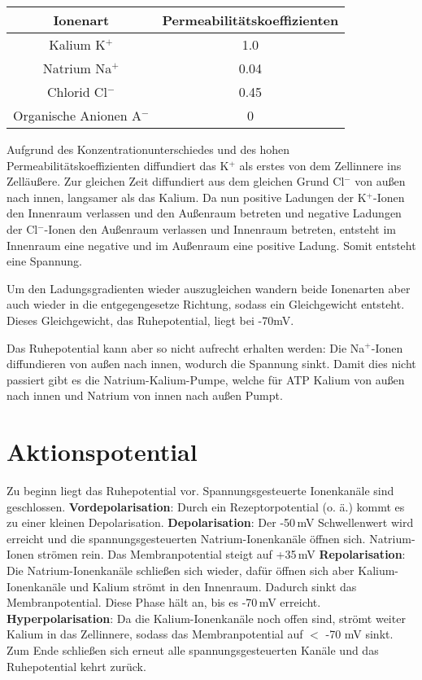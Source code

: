 \documentclass{article}
\begin{document}
\begin{center}
\begin{tabular}{ |c|c| }
\hline
 Ionenart & Permeabilitätskoeffizienten \\ 
\hline
 Kalium K$^+$ & 1.0 \\  
\hline
 Natrium Na$^+$ & 0.04 \\
\hline
 Chlorid Cl$^-$ & 0.45 \\  
\hline
 Organische Anionen A$^-$ & 0 \\
\hline 
\end{tabular}
\end{center}
Aufgrund des Konzentrationunterschiedes und des hohen Permeabilitätskoeffizienten diffundiert das K$^+$ als erstes von dem Zellinnere ins Zelläußere.
Zur gleichen Zeit diffundiert aus dem gleichen Grund Cl$^-$ von außen nach innen, langsamer als das Kalium.
Da nun positive Ladungen der K$^+$-Ionen den Innenraum verlassen und den Außenraum betreten und negative Ladungen der Cl$^-$-Ionen den Außenraum verlassen und Innenraum betreten, entsteht im Innenraum eine negative und im Außenraum eine positive Ladung. Somit entsteht eine Spannung.
  

Um den Ladungsgradienten wieder auszugleichen wandern beide Ionenarten aber auch wieder in die entgegengesetze Richtung, sodass ein Gleichgewicht entsteht.
Dieses Gleichgewicht, das Ruhepotential, liegt bei -70mV. 
 

Das Ruhepotential kann aber so nicht aufrecht erhalten werden: Die Na$^+$-Ionen diffundieren von außen nach innen, wodurch die Spannung sinkt.
Damit dies nicht passiert gibt es die Natrium-Kalium-Pumpe, welche für ATP Kalium von außen nach innen und Natrium von innen nach außen Pumpt. 
\section{Aktionspotential}
Zu beginn liegt das Ruhepotential vor. Spannungsgesteuerte Ionenkanäle sind geschlossen. \newline
\textbf{Vordepolarisation}: Durch ein Rezeptorpotential (o. ä.) kommt es zu einer kleinen Depolarisation. \newline
\textbf{Depolarisation}: Der -50\,mV Schwellenwert wird erreicht und die spannungsgesteuerten Natrium-Ionenkanäle öffnen sich. Natrium-Ionen strömen rein. Das Membranpotential steigt auf +35\,mV \newline
\textbf{Repolarisation}: Die Natrium-Ionenkanäle schließen sich wieder, dafür öffnen sich aber Kalium-Ionenkanäle und Kalium strömt in den Innenraum. Dadurch sinkt das Membranpotential. Diese Phase hält an, bis es -70\,mV erreicht. \newline
\textbf{Hyperpolarisation}: Da die Kalium-Ionenkanäle noch offen sind, strömt weiter Kalium in das Zellinnere, sodass das Membranpotential auf $<$ -70 mV sinkt. \newline
Zum Ende schließen sich erneut alle spannungsgesteuerten Kanäle und das Ruhepotential kehrt zurück.
\end{document}
